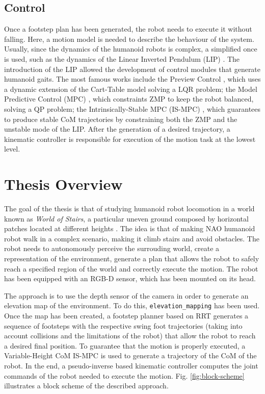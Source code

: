 \subsection{Control}
Once a footstep plan has been generated, the robot needs to execute it
without falling. Here, a motion model is needed to describe the behaviour of 
the system. Usually, since the dynamics of the humanoid robots is complex,
a simplified once is used, such as the dynamics of the Linear Inverted 
Pendulum (LIP) \cite{Kajita1991StudyOD}. The introduction of the LIP allowed
the development of control modules that generate humanoid gaits. The most 
famous works include the Preview Control \cite{Kajita2003BipedWP}, which
uses a dynamic extension of the Cart-Table model solving a LQR problem;
the Model Predictive Control (MPC) \cite{wieber:inria-00390462},
which constraints ZMP to keep the
robot balanced, solving a QP problem; the Intrinsically-Stable MPC (IS-MPC)
\cite{DBLP:conf/humanoids/SciancaCSLO16}, which guarantees to produce
stable CoM trajectories by constraining both the ZMP and the unstable mode
of the LIP. After the generation of a desired trajectory, a kinematic 
controller is responsible for execution of the motion task at the lowest
level.


\section{Thesis Overview}
The goal of the thesis is that of studying humanoid robot locomotion in a
world known as \textit{World of Stairs}, a particular uneven ground composed
by horizontal patches located at different heights \cite{ECC19}. The idea is
that of making NAO humanoid robot walk in a complex scenario, making it
climb stairs and avoid obstacles. The robot needs to autonomously perceive
the surrouding world, create a representation of the environment, generate
a plan that allows the robot to safely reach a specified region of the world
and correctly execute the motion. The robot has been equipped with an RGB-D
sensor, which has been mounted on its head.

The approach is to use the depth sensor of the camera in order to generate
an elevation map of the environment. To do this, \texttt{elevation\_mapping}
\cite{Fankhauser2018ProbabilisticTerrainMapping} has been used. Once the 
map has been created, a footstep planner based on RRT \cite{ECC19}
generates a sequence
of footsteps with the respective swing foot trajectories (taking into account
collisions and the limitations of the robot) that allow
the robot to reach a desired final position. To guarantee that the motion
is properly executed, a Variable-Height CoM IS-MPC \cite{SYROCO18} is used to
generate a trajectory of the CoM of the robot. In the end, a pseudo-inverse
based kinematic controller computes the joint commands of the robot needed to
execute the motion. Fig. \ref{fig:block-scheme} illustrates a block scheme
of the described approach.

